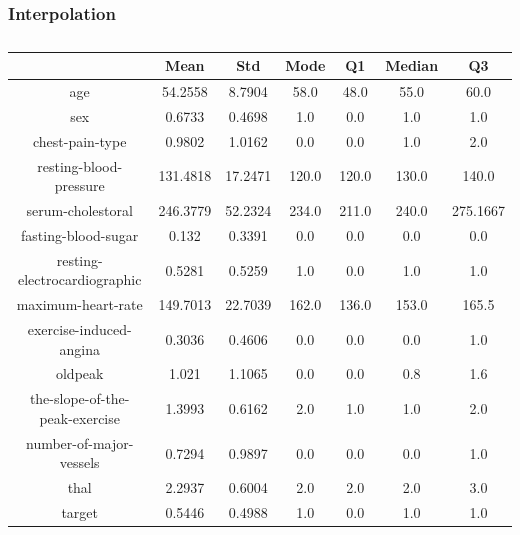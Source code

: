 \documentclass{classrep}
\begin{document}
{{            \subsubsection{Interpolation}
            \label{results:5-percent:interpolation} {
                \begin{table}[!htbp]
                    \centering
                    \begin{tabular}{|c|c|c|c|c|c|c|}
                        \hline
                        & Mean & Std & Mode & Q1 & Median & Q3 \\ \hline
                        age & 54.2558 & 8.7904 & 58.0 & 48.0 & 55.0 & 60.0 \\ \hline
                        sex & 0.6733 & 0.4698 & 1.0 & 0.0 & 1.0 & 1.0 \\ \hline
                        chest-pain-type & 0.9802 & 1.0162 & 0.0 & 0.0 & 1.0 & 2.0 \\ \hline
                        resting-blood-pressure & 131.4818 & 17.2471 & 120.0 & 120.0 & 130.0 & 140.0 \\ \hline
                        serum-cholestoral & 246.3779 & 52.2324 & 234.0 & 211.0 & 240.0 & 275.1667 \\ \hline
                        fasting-blood-sugar & 0.132 & 0.3391 & 0.0 & 0.0 & 0.0 & 0.0 \\ \hline
                        resting-electrocardiographic & 0.5281 & 0.5259 & 1.0 & 0.0 & 1.0 & 1.0 \\ \hline
                        maximum-heart-rate & 149.7013 & 22.7039 & 162.0 & 136.0 & 153.0 & 165.5 \\ \hline
                        exercise-induced-angina & 0.3036 & 0.4606 & 0.0 & 0.0 & 0.0 & 1.0 \\ \hline
                        oldpeak & 1.021 & 1.1065 & 0.0 & 0.0 & 0.8 & 1.6 \\ \hline
                        the-slope-of-the-peak-exercise & 1.3993 & 0.6162 & 2.0 & 1.0 & 1.0 & 2.0 \\ \hline
                        number-of-major-vessels & 0.7294 & 0.9897 & 0.0 & 0.0 & 0.0 & 1.0 \\ \hline
                        thal & 2.2937 & 0.6004 & 2.0 & 2.0 & 2.0 & 3.0 \\ \hline
                        target & 0.5446 & 0.4988 & 1.0 & 0.0 & 1.0 & 1.0 \\ \hline
                    \end{tabular}
                    \caption{}
                    \label{result_5_Interpolation}
                \end{table}
                \FloatBarrier

}}}
\end{document}
